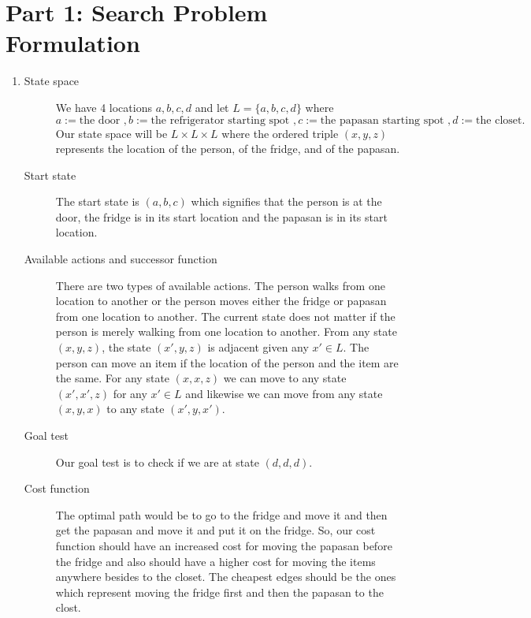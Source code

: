 \documentclass[11pt]{amsart}
\begin{document}
\maketitle

\section*{Part 1: Search Problem Formulation}

\begin{enumerate}

\item

\begin{description}

    \item[State space] We have 4 locations $a,b,c,d$ and let $L=\{a,b,c,d\}$ where
    $a:=\text{the door },b:=\text{the refrigerator starting spot },c:=\text{the papasan starting
    spot }, d:=\text{the closet.}$ Our state space will be $L \times L\times L$ where the ordered
    triple $(x,y,z)$ represents the location of the person, of the fridge, and of the papasan.

    \item[Start state]  The start state is $(a,b,c)$ which signifies that the person is at
    the door, the fridge is in its start location and the papasan is in its start location.

    \item[Available actions and successor function] There are two types of available
    actions.  The person walks from one location to another or the person moves either the fridge or
    papasan from one location to another.  The current state does not matter   if the person is
    merely walking from one location to another.  From any state $(x,y,z)$, the state $(x',y,z)$ is
    adjacent given any $x' \in L$. The person can move an item if the location of the person and the
    item are the same.   For     any state $(x,x,z)$ we can move to any state $(x',x',z)$ for any
    $x' \in L$ and likewise we can move from any state $(x,y,x)$ to any state $(x',y,x')$.

    \item[Goal test] Our goal test is to check if we are at state $(d,d,d)$.

    \item[Cost function] The optimal path would be to go to the fridge and move it and then
    get the papasan and move it and put it on the fridge.  So, our cost function should have an
    increased cost for moving the papasan before the fridge and also should have a higher cost for
    moving the items anywhere besides to the closet.  The cheapest edges should be the ones which
    represent moving the fridge first and then the papasan to the clost.


\end{description}
\end{enumerate}
\end{document}
